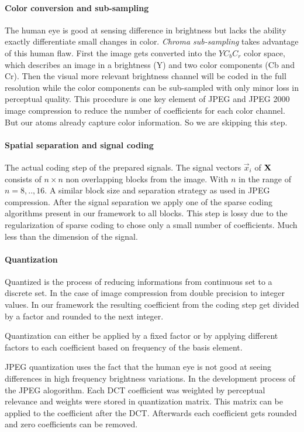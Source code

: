 \paragraph{Color conversion and sub-sampling} The human eye is good at sensing
difference in brightness but lacks the ability exactly differentiate small
changes in color. \emph{Chroma sub-sampling} takes advantage of this human flaw.
First the image gets converted into the $YC_bC_r$ color space, which describes
an image in a brightness (Y) and two color components (Cb and
Cr). Then the visual more relevant brightness channel will be coded in
the full resolution while the color components can be sub-sampled with
only minor loss in perceptual quality. This procedure is one key element of JPEG
and JPEG 2000 image compression to reduce the number of coefficients for each
color channel. But our atoms already capture color information. So we are
skipping this step. %

\paragraph{Spatial separation and signal coding}
The actual coding step of the prepared signals. The signal vectors $\vec{x}_i$
of $\boldsymbol{\mathrm{X}}$ consists of $n \times n$ non overlapping blocks from the image.
With $n$ in the range of $n=8,..,16$. A similar block size and separation
strategy as used in JPEG compression. After the signal separation we apply one
of the sparse coding algorithms present in our framework to all blocks. This
step is lossy due to the regularization of sparse coding to chose only a small
number  of coefficients. Much less than the dimension of the signal. 

\paragraph{Quantization}
Quantized is the process of reducing informations from continuous set to a
discrete set. In the case of image compression from double precision to integer
values. In our framework the resulting coefficient from the coding step get
divided by a factor and rounded to the next integer.  

Quantization can either be applied by a fixed factor or by applying different 
factors to each coefficient based on frequency of the basis element.

JPEG quantization uses the fact that the human eye is not good at seeing
differences in high frequency brightness variations. In the development
process of the JPEG alogorithm. Each DCT coefficient was weighted by perceptual
relevance and weights were stored in quantization matrix. 
This matrix can be applied to the coefficient after the DCT. 
Afterwards each coefficient gets rounded and zero coefficients can be removed.

